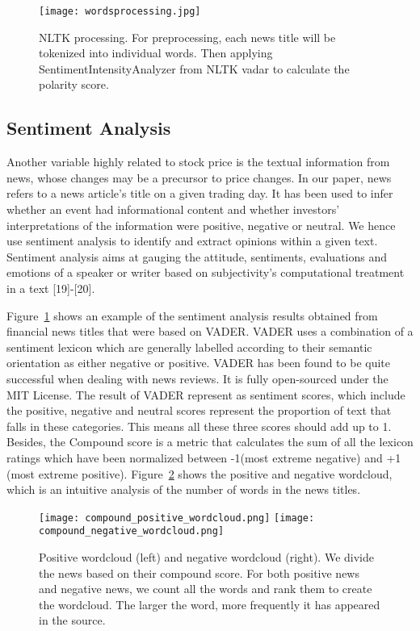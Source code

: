 \documentclass{article}
\begin{document}
\begin{figure}
  \centering
  \texttt{[image: wordsprocessing.jpg]}
  \caption{NLTK processing. For preprocessing, each news title will be tokenized into individual words. Then applying SentimentIntensityAnalyzer from NLTK vadar to calculate the polarity score.}
\label{figure:NLTK}
\end{figure}


\subsection{Sentiment Analysis}


Another variable highly related to stock price is the textual information from news, whose changes may be a precursor to price changes. 
In our paper, news refers to a news article's title on a given trading day. It has been used to infer whether an event had informational content and whether investors' interpretations of the information were positive, negative or neutral. We hence use sentiment analysis to identify and extract opinions within a given text. Sentiment analysis aims at gauging the attitude, sentiments, evaluations and emotions of a speaker or writer based on subjectivity's computational treatment in a text [19]-[20].


Figure~\ref{figure:NLTK} shows an example of the sentiment analysis results obtained from financial news titles that were based on VADER. VADER uses a combination of a sentiment lexicon which are generally labelled according to their semantic orientation as either negative or positive.
VADER has been found to be quite successful when dealing with news reviews. It is fully open-sourced under the MIT License. The result of VADER represent as sentiment scores, which include the positive, negative and neutral scores represent the proportion of text that falls in these categories. This means all these three scores should add up to 1. Besides, the Compound score is a metric that calculates the sum of all the lexicon ratings which have been normalized between -1(most extreme negative) and +1 (most extreme positive). Figure~\ref{figure:cloud} shows the positive and negative wordcloud, which is an intuitive analysis of the number of words in the news titles.


\begin{figure}
  \centering
  \texttt{[image: compound\_positive\_wordcloud.png]}
     \texttt{[image: compound\_negative\_wordcloud.png]}
  \caption{Positive wordcloud (left) and negative wordcloud (right).
  We divide the news based on their compound score. For both positive news and negative news, we count all the words and rank them to create the wordcloud. The larger the word, more frequently it has appeared in the source. 
  }
\label{figure:cloud}
\end{figure}
\end{document}
